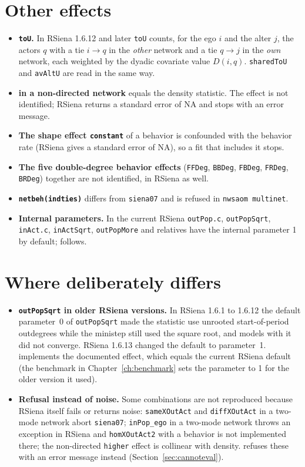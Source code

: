 \section*{Other effects}

\begin{itemize}
\item \textbf{\texttt{toU}.} In RSiena 1.6.12 and later \texttt{toU} counts, for the ego $i$
  and the alter $j$, the actors $q$ with a tie $i\to q$ in the \emph{other} network and a
  tie $q\to j$ in the \emph{own} network, each weighted by the dyadic covariate value $D(i,q)$.
  \texttt{sharedToU} and \texttt{avAltU} are read in the same way.
\item \textbf{ in a non-directed network} equals the density statistic.
  The effect is not identified; RSiena returns a standard error of NA and \nwsaom{} stops with
  an error message.
\item \textbf{The shape effect \texttt{constant}} of a behavior is confounded with the
  behavior rate (RSiena gives a standard error of NA), so a fit that includes it stops.
\item \textbf{The five double-degree behavior effects} (\texttt{FFDeg}, \texttt{BBDeg},
  \texttt{FBDeg}, \texttt{FRDeg}, \texttt{BRDeg}) together are not identified, in RSiena as well.
\item \textbf{\texttt{netbeh(indties)}} differs from \texttt{siena07} and is refused in
  \texttt{nwsaom multinet}.
\item \textbf{Internal parameters.} In the current RSiena \texttt{outPop.c}, \texttt{outPopSqrt},
  \texttt{inAct.c}, \texttt{inActSqrt}, \texttt{outPopMore} and relatives have the internal
  parameter 1 by default; \nwsaom{} follows.
\end{itemize}

\section*{Where \nwsaom{} deliberately differs}

\begin{itemize}
\item \textbf{\texttt{outPopSqrt} in older RSiena versions.} In RSiena 1.6.1 to 1.6.12 the
  default parameter~0 of \texttt{outPopSqrt} made the statistic use unrooted start-of-period
  outdegrees while the ministep still used the square root, and models with it did not converge.
  RSiena 1.6.13 changed the default to parameter~1. \nwsaom{} implements the documented effect, which
  equals the current RSiena default (the benchmark in Chapter~\ref{ch:benchmark} sets the parameter
  to 1 for the older version it used).
\item \textbf{Refusal instead of noise.} Some combinations are not reproduced
  because RSiena itself fails or returns noise: \texttt{sameXOutAct} and
  \texttt{diffXOutAct} in a two-mode network abort \texttt{siena07}; \texttt{inPop\_ego}
  in a two-mode network throws an exception in RSiena and \texttt{homXOutAct2} with a behavior is not implemented there;
  the non-directed \texttt{higher} effect is collinear with density. \nwsaom{}
  refuses these with an error message instead (Section~\ref{sec:cannoteval}).
\end{itemize}

